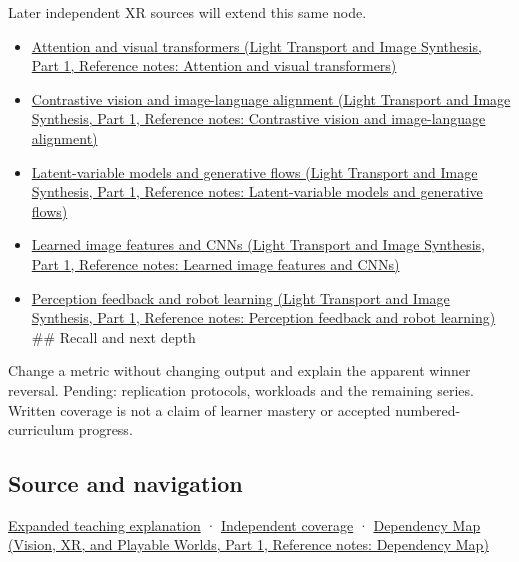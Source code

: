 Later independent XR sources will extend this same node.

\begin{itemize}
\tightlist
\item
  \href{../04-Light-Transport-and-Image-Synthesis-P01/main.pdf\#appendix-a9d5dfdd164a}{Attention and visual transformers (Light Transport and Image Synthesis, Part 1, Reference notes: Attention and visual transformers)}
\item
  \href{../04-Light-Transport-and-Image-Synthesis-P01/main.pdf\#appendix-772f1fd96148}{Contrastive vision and image-language alignment (Light Transport and Image Synthesis, Part 1, Reference notes: Contrastive vision and image-language alignment)}
\item
  \href{../04-Light-Transport-and-Image-Synthesis-P01/main.pdf\#appendix-2c568f05ee34}{Latent-variable models and generative flows (Light Transport and Image Synthesis, Part 1, Reference notes: Latent-variable models and generative flows)}
\item
  \href{../04-Light-Transport-and-Image-Synthesis-P01/main.pdf\#appendix-47c51ea026fb}{Learned image features and CNNs (Light Transport and Image Synthesis, Part 1, Reference notes: Learned image features and CNNs)}
\item
  \href{../04-Light-Transport-and-Image-Synthesis-P01/main.pdf\#appendix-b0c42da325f1}{Perception feedback and robot learning (Light Transport and Image Synthesis, Part 1, Reference notes: Perception feedback and robot learning)} \#\# Recall and next depth
\end{itemize}

Change a metric without changing output and explain the apparent winner reversal. Pending: replication protocols, workloads and the remaining series. Written coverage is not a claim of learner mastery or accepted numbered-curriculum progress.

\subsection{Source and navigation}\label{appendix-65788587ef78-source-and-navigation}

\hypertarget{appendix-65788587ef78-source-and-navigation}{}

\hyperref[04-visual-computing-ii-ch042-make-the-mathematics-operational-without-pretending-to-run-a-human-study]{Expanded teaching explanation} · \hyperref[appendix-fd090d982a15-xr01---independent-seeing-and-representation-source]{Independent coverage} · \href{../07-Vision-XR-and-Playable-Worlds-P01/main.pdf\#appendix-4ad47bdd269a}{Dependency Map (Vision, XR, and Playable Worlds, Part 1, Reference notes: Dependency Map)}
